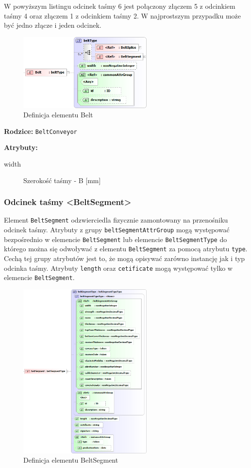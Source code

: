 \documentclass[12pt,a4paper]{article}
\begin{document}
W powyższym listingu odcinek taśmy 6 jest połączony złączem 5 z odcinkiem taśmy
4 oraz złączem 1 z odcinkiem taśmy 2. W najprostszym przypadku może być jedno
złącze i jeden odcinek.

\begin{figure}[H]
  \centering
  \includegraphics[width=0.6\textwidth]{png/liquid/Belt}
  \caption{Definicja elementu Belt}
  \label{fig:belt-xsd}
\end{figure}

\noindent\textbf{Rodzice:} \texttt{BeltConveyor}

\noindent\textbf{Atrybuty:}
\begin{description}
\item[width] Szerokość taśmy - B [mm]
\end{description}


\subsubsection{Odcinek taśmy <BeltSegment>}
Element {\tt BeltSegment} odzwierciedla fizycznie zamontowany na przenośniku
odcinek taśmy.  Atrybuty z grupy {\tt beltSegmentAttrGroup} mogą występować
bezpośrednio w elemencie {\tt BeltSegment} lub elemencie {\tt BeltSegmentType}
do którego można się odwoływać z elementu {\tt BeltSegment} za pomocą atrybutu
{\tt type}.  Cechą tej grupy atrybutów jest to, że mogą opisywać zarówno
instancję jak i typ odcinka taśmy. Atrybuty {\tt length} oraz {\tt cetificate}
mogą występować tylko w elemencie {\tt BeltSegment}.

\begin{figure}[H]
  \centering
  \includegraphics[width=0.6\textwidth]{png/liquid/BeltSegment}
  \caption{Definicja elementu BeltSegment}
  \label{fig:beltSegment-xsd}
\end{figure}
\end{document}
